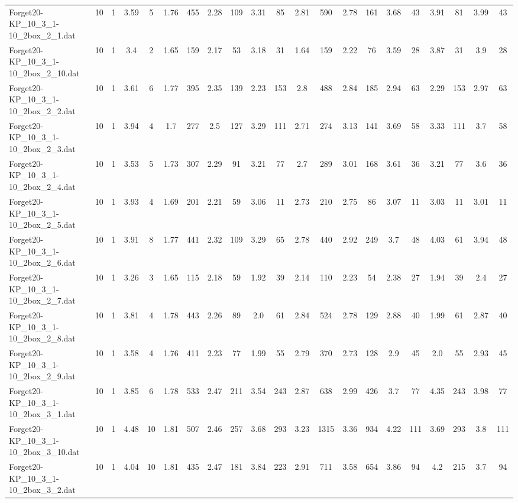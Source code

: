 \begin{sidewaystable}[!ht]
{\begin{tabular}{lcccccccccccccccccccc}
Forget20-KP\_10\_3\_1-10\_2box\_2\_1.dat & 10 & 1 & 3.59 & 5 & 1.76 & 455 & 2.28 & 109 & 3.31 & 85 & 2.81 & 590 & 2.78 & 161 & 3.68 & 43 & 3.91 & 81 & 3.99 & 43 \\
Forget20-KP\_10\_3\_1-10\_2box\_2\_10.dat & 10 & 1 & 3.4 & 2 & 1.65 & 159 & 2.17 & 53 & 3.18 & 31 & 1.64 & 159 & 2.22 & 76 & 3.59 & 28 & 3.87 & 31 & 3.9 & 28 \\
Forget20-KP\_10\_3\_1-10\_2box\_2\_2.dat & 10 & 1 & 3.61 & 6 & 1.77 & 395 & 2.35 & 139 & 2.23 & 153 & 2.8 & 488 & 2.84 & 185 & 2.94 & 63 & 2.29 & 153 & 2.97 & 63 \\
Forget20-KP\_10\_3\_1-10\_2box\_2\_3.dat & 10 & 1 & 3.94 & 4 & 1.7 & 277 & 2.5 & 127 & 3.29 & 111 & 2.71 & 274 & 3.13 & 141 & 3.69 & 58 & 3.33 & 111 & 3.7 & 58 \\
Forget20-KP\_10\_3\_1-10\_2box\_2\_4.dat & 10 & 1 & 3.53 & 5 & 1.73 & 307 & 2.29 & 91 & 3.21 & 77 & 2.7 & 289 & 3.01 & 168 & 3.61 & 36 & 3.21 & 77 & 3.6 & 36 \\
Forget20-KP\_10\_3\_1-10\_2box\_2\_5.dat & 10 & 1 & 3.93 & 4 & 1.69 & 201 & 2.21 & 59 & 3.06 & 11 & 2.73 & 210 & 2.75 & 86 & 3.07 & 11 & 3.03 & 11 & 3.01 & 11 \\
Forget20-KP\_10\_3\_1-10\_2box\_2\_6.dat & 10 & 1 & 3.91 & 8 & 1.77 & 441 & 2.32 & 109 & 3.29 & 65 & 2.78 & 440 & 2.92 & 249 & 3.7 & 48 & 4.03 & 61 & 3.94 & 48 \\
Forget20-KP\_10\_3\_1-10\_2box\_2\_7.dat & 10 & 1 & 3.26 & 3 & 1.65 & 115 & 2.18 & 59 & 1.92 & 39 & 2.14 & 110 & 2.23 & 54 & 2.38 & 27 & 1.94 & 39 & 2.4 & 27 \\
Forget20-KP\_10\_3\_1-10\_2box\_2\_8.dat & 10 & 1 & 3.81 & 4 & 1.78 & 443 & 2.26 & 89 & 2.0 & 61 & 2.84 & 524 & 2.78 & 129 & 2.88 & 40 & 1.99 & 61 & 2.87 & 40 \\
Forget20-KP\_10\_3\_1-10\_2box\_2\_9.dat & 10 & 1 & 3.58 & 4 & 1.76 & 411 & 2.23 & 77 & 1.99 & 55 & 2.79 & 370 & 2.73 & 128 & 2.9 & 45 & 2.0 & 55 & 2.93 & 45 \\
Forget20-KP\_10\_3\_1-10\_2box\_3\_1.dat & 10 & 1 & 3.85 & 6 & 1.78 & 533 & 2.47 & 211 & 3.54 & 243 & 2.87 & 638 & 2.99 & 426 & 3.7 & 77 & 4.35 & 243 & 3.98 & 77 \\
Forget20-KP\_10\_3\_1-10\_2box\_3\_10.dat & 10 & 1 & 4.48 & 10 & 1.81 & 507 & 2.46 & 257 & 3.68 & 293 & 3.23 & 1315 & 3.36 & 934 & 4.22 & 111 & 3.69 & 293 & 3.8 & 111 \\
Forget20-KP\_10\_3\_1-10\_2box\_3\_2.dat & 10 & 1 & 4.04 & 10 & 1.81 & 435 & 2.47 & 181 & 3.84 & 223 & 2.91 & 711 & 3.58 & 654 & 3.86 & 94 & 4.2 & 215 & 3.7 & 94 \\

\end{tabular}}
\end{sidewaystable}
